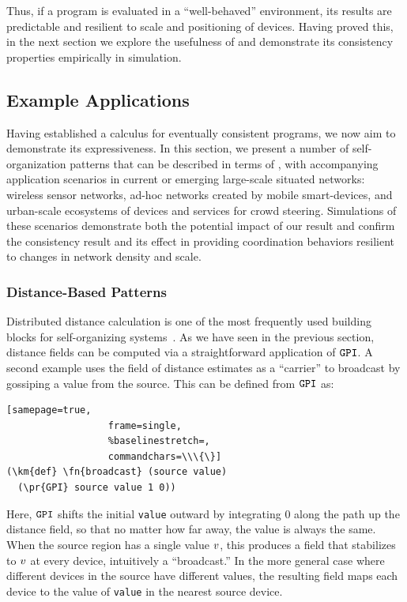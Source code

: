 \documentclass[12pt,a4paper,twoside,openright]{book}
\begin{document}
Thus, if a program is evaluated in a ``well-behaved'' environment, its results are predictable and resilient to scale and positioning of devices.
%
Having proved this, in the next section we explore the usefulness of \calculus{} and demonstrate its consistency properties empirically in simulation.

\subsection{Example Applications}

Having established a calculus for eventually consistent programs, we now aim to demonstrate its expressiveness.
%
In this section, we present a number of self-organization patterns that can be described in terms of \calculus{}, with accompanying application scenarios in current or emerging large-scale situated networks: wireless sensor networks, ad-hoc networks created by mobile smart-devices, and urban-scale ecosystems of devices and services for crowd steering.
%
Simulations of these scenarios demonstrate both the potential impact of our result and confirm the consistency result and its effect in providing coordination behaviors resilient to changes in network density and scale.

\subsubsection{Distance-Based Patterns}

Distributed distance calculation is one of the most frequently used building blocks for self-organizing systems~\cite{FDMVA-NACO2012}.
%
As we have seen in the previous section, distance fields can be computed via a straightforward application of $\texttt{GPI}$.
%
A second example uses the field of distance estimates as a ``carrier'' to broadcast by gossiping a value from the source.  This can be defined from $\texttt{GPI}$ as:
\begin{Verbatim}[samepage=true,
                  frame=single,
                  %baselinestretch=,
                  commandchars=\\\{\}]
(\km{def} \fn{broadcast} (source value)
  (\pr{GPI} source value 1 0))
\end{Verbatim}
Here, $\texttt{GPI}$ shifts the initial {\tt value} outward by integrating $0$ along the path up the distance field, so that no matter how far away, the value is always the same.
%
When the source region has a single value $v$, this produces a field that stabilizes to $v$ at every device, intuitively a ``broadcast.''
%
In the more general case where different devices in the source have different values, the resulting field maps each device to the value of \texttt{value} in the nearest source device.
\end{document}
